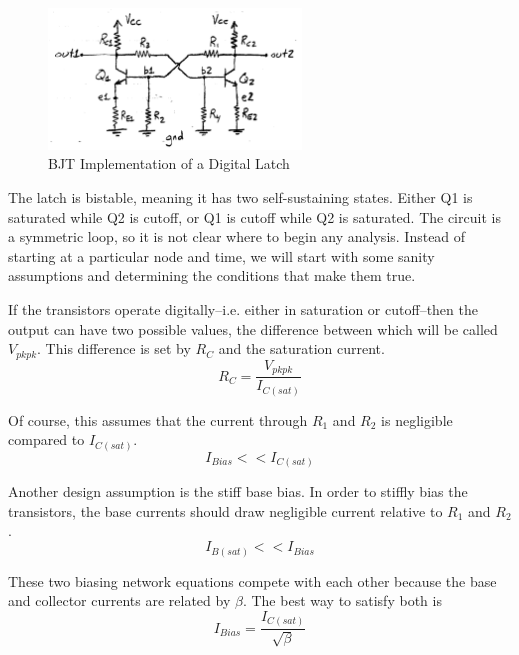 \documentclass[titlepage, letterpaper, 10.5pt]{article}
\begin{document}
\begin{figure}[ht]
	\centering
	\includegraphics[width=0.6\textwidth]{diagrams/latch-circuit}
	\caption{BJT Implementation of a Digital Latch}
	\label{latch-circuit-diagram}
\end{figure}

The latch is bistable, meaning it has two self-sustaining states.
Either Q1 is saturated while Q2 is cutoff, or Q1 is cutoff while Q2 is saturated.
The circuit is a symmetric loop, so it is not clear where to begin any analysis.
Instead of starting at a particular node and time, we will start with some sanity
assumptions and determining the conditions that make them true.

If the transistors operate digitally--i.e. either in saturation or cutoff--then the output
can have two possible values, the difference between which will be called $V_{pkpk}$.
This difference is set by $R_{C}$ and the saturation current.
\begin{equation}
R_{C}=\frac{V_{pkpk}}{I_{C(sat)}}
\label{rc-eq}
\end{equation}

Of course, this assumes that the current through $R_{1}$ and $R_{2}$ is negligible compared to $I_{C(sat)}$.
\begin{equation*}
I_{Bias}<<I_{C(sat)}
\end{equation*}

Another design assumption is the stiff base bias.
In order to stiffly bias the transistors, the base currents should draw negligible current
relative to $R_{1}$ and $R_{2}$.
\begin{equation*}
I_{B(sat)}<<I_{Bias}
\end{equation*}

These two biasing network equations
compete with each other because the base and collector currents are related by $\beta$.
The best way to satisfy both is
\begin{equation}
I_{Bias}=\frac{I_{C(sat)}}{\sqrt{\beta}}
\label{i-bias-design-decision}
\end{equation}
\end{document}
